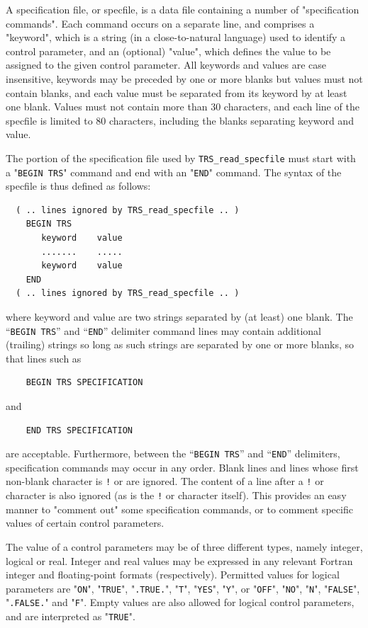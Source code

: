 \documentclass{galahad}
\newcommand{\packagename}{TRS}
\begin{document}
A specification file, or specfile, is a data file containing a number of
"specification commands". Each command occurs on a separate line,
and comprises a "keyword",
which is a string (in a close-to-natural language) used to identify a
control parameter, and
an (optional) "value", which defines the value to be assigned to the given
control parameter. All keywords and values are case insensitive,
keywords may be preceded by one or more blanks but
values must not contain blanks, and
each value must be separated from its keyword by at least one blank.
Values must not contain more than 30 characters, and
each line of the specfile is limited to 80 characters,
including the blanks separating keyword and value.

The portion of the specification file used by
{\tt \packagename\_read\_specfile}
must start
with a "{\tt BEGIN \packagename}" command and end with an
"{\tt END}" command.  The syntax of the specfile is thus defined as follows:
\begin{verbatim}
  ( .. lines ignored by TRS_read_specfile .. )
    BEGIN TRS
       keyword    value
       .......    .....
       keyword    value
    END
  ( .. lines ignored by TRS_read_specfile .. )
\end{verbatim}
where keyword and value are two strings separated by (at least) one blank.
The ``{\tt BEGIN \packagename}'' and ``{\tt END}'' delimiter command lines
may contain additional (trailing) strings so long as such strings are
separated by one or more blanks, so that lines such as
\begin{verbatim}
    BEGIN TRS SPECIFICATION
\end{verbatim}
and
\begin{verbatim}
    END TRS SPECIFICATION
\end{verbatim}
are acceptable. Furthermore,
between the
``{\tt BEGIN \packagename}'' and ``{\tt END}'' delimiters,
specification commands may occur in any order.  Blank lines and
lines whose first non-blank character is {\tt !} or {\tt *} are ignored.
The content
of a line after a {\tt !} or {\tt *} character is also
ignored (as is the {\tt !} or {\tt *}
character itself). This provides an easy manner to "comment out" some
specification commands, or to comment specific values
of certain control parameters.

The value of a control parameters may be of three different types, namely
integer, logical or real.
Integer and real values may be expressed in any relevant Fortran integer and
floating-point formats (respectively). Permitted values for logical
parameters are "{\tt ON}", "{\tt TRUE}", "{\tt .TRUE.}", "{\tt T}",
"{\tt YES}", "{\tt Y}", or "{\tt OFF}", "{\tt NO}",
"{\tt N}", "{\tt FALSE}", "{\tt .FALSE.}" and "{\tt F}".
Empty values are also allowed for
logical control parameters, and are interpreted as "{\tt TRUE}".
\end{document}
